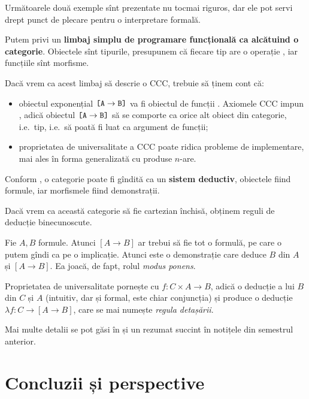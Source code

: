 \documentclass[12pt, a4paper]{article}
\begin{document}
\vspace{1cm}

Următoarele două exemple sînt prezentate nu tocmai riguros, dar ele pot servi drept
punct de plecare pentru o interpretare formală.

Putem privi un \textbf{limbaj simplu de programare funcțională ca alcătuind o categorie}.
Obiectele sînt tipurile, presupunem că fiecare tip are o operație , iar
funcțiile sînt morfisme.

Dacă vrem ca acest limbaj să descrie o CCC, trebuie să ținem cont că:
\begin{itemize}
\item obiectul exponențial $\texttt{[A} \to \texttt{B]}$ va fi obiectul de funcții .
  Axiomele CCC impun , adică obiectul $\texttt{[A} \to \texttt{B]}$ să se comporte
  ca orice alt obiect din categorie, i.e.\ tip, i.e.\ să poată fi luat ca argument
  de funcții;
\item proprietatea de universalitate a CCC poate ridica probleme de implementare, mai
  ales în forma generalizată cu produse $ n $-are.
\end{itemize}

\vspace{1cm}

Conform \cite{lambek}, o categorie poate fi gîndită ca un \textbf{sistem deductiv},
obiectele fiind formule, iar morfismele fiind demonstrații.

Dacă vrem ca această categorie să fie cartezian închisă, obținem reguli de
deducție binecunoscute.

Fie $ A, B $ formule. Atunci $ [A \to B] $ ar trebui să fie tot o formulă,
pe care o putem gîndi ca pe o implicație. Atunci  este o
demonstrație care deduce $ B $ din $ A $ și $ [A \to B] $. Ea joacă,
de fapt, rolul \emph{modus ponens}.

Proprietatea de universalitate pornește cu $ f : C \times A \to B $, adică
o deducție a lui $ B $ din $ C $ și $ A $ (intuitiv, dar și formal, este chiar
conjuncția) și produce o deducție $ \lambda f : C \to [A \to B] $, care se mai
numește \emph{regula detașării}.

Mai multe detalii se pot găsi în \cite{lambek} și un rezumat succint în notițele
din semestrul anterior.



\section{Concluzii și perspective}
\end{document}
